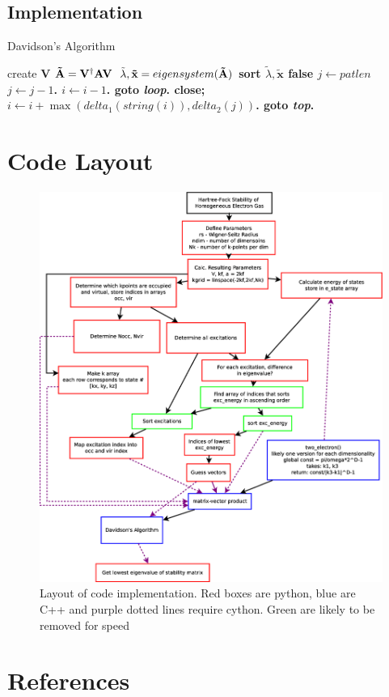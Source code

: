 \documentclass{revtex4}
\begin{document}
\subsection{Implementation}
\begin{algorithm}[H]
\caption{Davidson's Algorithm}\label{davidson}
\begin{algorithmic}[1]
\State create \bf{V}
\State $\bf{\tilde{A}} = \bf{V}^\dag\bf{AV}$
\State $\tilde{\lambda},\mathbf{\tilde{x}} = eigensystem(\bf{\tilde{A}})$
\State sort $\tilde{\lambda},\mathbf{\tilde{x}}$
 \Return false
\EndIf
\State $j \gets \textit{patlen}$
\State $j \gets j-1$.
\State $i \gets i-1$.
\State \textbf{goto} \emph{loop}.
\State \textbf{close};
\EndIf
\State $i \gets i+\max(\textit{delta}_1(\textit{string}(i)),\textit{delta}_2(j))$.
\State \textbf{goto} \emph{top}.
\EndFor

\end{algorithmic}
\end{algorithm}


\section{Code Layout}
\begin{figure}[H]
   \includegraphics[width=1.0\linewidth]{figures/hf_stability_diagram.eps}
   \caption {Layout of code implementation. Red boxes are python, blue are C++ and purple dotted lines require cython. Green are likely to be removed for speed}
   \label{fig:code_diagram}
\end{figure} 

\section{References}

\end{document}
